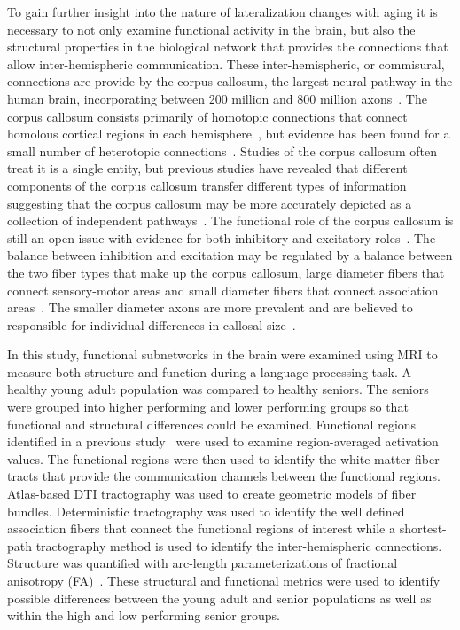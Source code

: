To gain further insight into the nature of lateralization changes with aging it is necessary to not only examine functional activity in the brain, but also the structural properties in the biological network that provides the connections that allow inter-hemispheric communication. These inter-hemispheric, or commisural, connections are provide by the corpus callosum, the largest neural pathway in the human brain, incorporating between 200 million and 800 million axons~\cite{Banich1995}. The corpus callosum consists primarily of homotopic connections that connect homolous cortical regions in each hemisphere~\cite{Hellige1993}, but evidence has been found for a small number of heterotopic connections~\cite{Wahl2009}. Studies of the corpus callosum often treat it is a single entity, but previous studies have revealed that different components of the corpus callosum transfer different types of information suggesting that the corpus callosum may be more accurately depicted as a collection of independent pathways~\cite{Banich1995}. The functional role of the corpus callosum is still an open issue with evidence for both inhibitory and excitatory roles~\cite{Yazgan1995}. The balance between inhibition and excitation may be regulated by a balance between the two fiber types that make up the corpus callosum, large diameter fibers that connect sensory-motor areas and small diameter fibers that connect association areas~\cite{Yazgan1995}. The smaller diameter axons are more prevalent and are believed to responsible for individual differences in callosal size~\cite{Bloom2005}. 

In this study, functional subnetworks in the brain were examined using MRI to measure both structure and function during a language processing task. A healthy young adult population was compared to healthy seniors. The seniors were grouped into higher performing and lower performing groups so that functional and structural differences could be examined. Functional regions identified in a previous study~\cite{Gunawardena2009} were used to examine region-averaged activation values. The functional regions were then used to identify the white matter fiber tracts that provide the communication channels between the functional regions. Atlas-based DTI tractography was used to create geometric models of fiber bundles. Deterministic tractography was used to identify the well defined association fibers that connect the functional regions of interest while a shortest-path tractography method is used to identify the inter-hemispheric connections. Structure was quantified with arc-length parameterizations of fractional anisotropy (FA)~\cite{Jones2005,Corouge2006,Maddah2008d,ODonnell2009}. These structural and functional metrics were used to identify possible differences between the young adult and senior populations as well as within the high and low performing senior groups.

